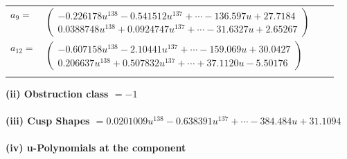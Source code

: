 \documentclass[1p]{elsarticle_modified}
\theoremstyle{definition}
\begin{document}
\begin{tabular}{m{7pt} m{180pt} m{7pt} m{180pt} }
\flushright $a_{9}=$&$\begin{pmatrix}-0.226178 u^{138}-0.541512 u^{137}+\cdots-136.597 u+27.7184\\0.0388748 u^{138}+0.0924747 u^{137}+\cdots-31.6327 u+2.65267\end{pmatrix}$ \\
\flushright $a_{12}=$&$\begin{pmatrix}-0.607158 u^{138}-2.10441 u^{137}+\cdots-159.069 u+30.0427\\0.206637 u^{138}+0.507832 u^{137}+\cdots+37.1120 u-5.50176\end{pmatrix}$\\&\end{tabular}
\flushleft \textbf{(ii) Obstruction class $= -1$}\\~\\
\flushleft \textbf{(iii) Cusp Shapes $= 0.0201009 u^{138}-0.638391 u^{137}+\cdots-384.484 u+31.1094$}\\~\\
\newpage\renewcommand{\arraystretch}{1}
\flushleft \textbf{(iv) u-Polynomials at the component}\newline \\
\end{document}
